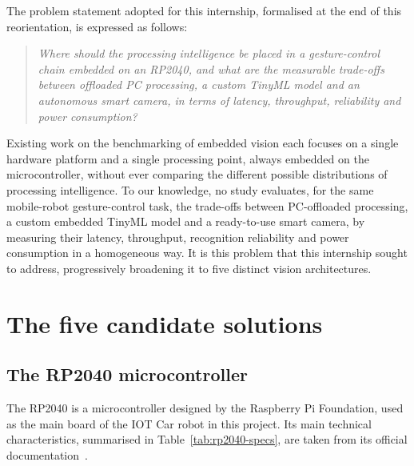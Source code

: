 \documentclass[12pt,a4paper]{report}
\begin{document}
	The problem statement adopted for this internship, formalised at the end of this reorientation, is expressed as follows:
	
	\begin{quote}
		\itshape Where should the processing intelligence be placed in a gesture-control chain embedded on an RP2040, and what are the measurable trade-offs between offloaded PC processing, a custom TinyML model and an autonomous smart camera, in terms of latency, throughput, reliability and power consumption?
	\end{quote}
	
	Existing work on the benchmarking of embedded vision each focuses on a single hardware platform and a single processing point, always embedded on the microcontroller, without ever comparing the different possible distributions of processing intelligence. To our knowledge, no study evaluates, for the same mobile-robot gesture-control task, the trade-offs between PC-offloaded processing, a custom embedded TinyML model and a ready-to-use smart camera, by measuring their latency, throughput, recognition reliability and power consumption in a homogeneous way. It is this problem that this internship sought to address, progressively broadening it to five distinct vision architectures.
	
	
\chapter{The five candidate solutions}
	\section{The RP2040 microcontroller}
	
	The RP2040 is a microcontroller designed by the Raspberry Pi Foundation, used as the main board of the IOT Car robot in this project. Its main technical characteristics, summarised in Table~\ref{tab:rp2040-specs}, are taken from its official documentation~\cite{rp2040_datasheet}.
	
\end{document}
